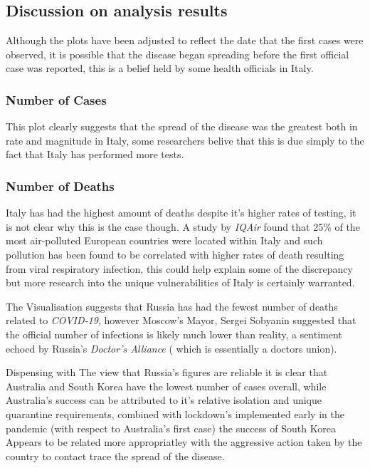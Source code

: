 \documentclass[11pt]{article}
\begin{document}
\subsection{Discussion on analysis results}
\label{sec:orgdc0628a}
Although the plots have been adjusted to reflect the date that the first cases were observed, it is possible that the disease began spreading before the first official case was reported, this is a belief held by some health officials in Italy.\cite{godin2020}

\subsubsection{Number of Cases}
\label{sec:orge8291b8}
This plot clearly suggests that the spread of the disease was the greatest both in rate and magnitude in Italy, some researchers belive that this is due simply to the fact that Italy has performed more tests. \cite{godin2020}
\subsubsection{Number of Deaths}
\label{sec:org40c1895}
Italy has had the highest amount of deaths despite it's higher rates of testing,
it is not clear why this is the case though. A study by \emph{IQAir} found that 25\% of the
most air-polluted European countries were located within Italy \cite{iqair2019}
and such pollution has been found to be correlated with higher rates of death
resulting from viral respiratory infection,
\cite{ciencewicki2007,croft2019,zhang2019} this could help explain some of the discrepancy but more research into the unique vulnerabilities of Italy is certainly warranted.

The Visualisation suggests that Russia has had the fewest number of deaths related to \emph{COVID-19}, however Moscow's Mayor, Sergei Sobyanin suggested that the official number of infections is likely much lower than reality, a sentiment echoed by Russia's \emph{Doctor's Alliance} ( which is essentially a doctors union). \cite{dole2020}

Dispensing with The view that Russia's figures are reliable it is clear that
Australia and South Korea have the lowest number of cases overall, while
Australia's success can be attributed to it's relative isolation and unique
quarantine requirements,
\cite{departmentofagrigulturewaterandtheenvironmentaustralia2019} combined with
lockdown's implemented early in the pandemic (with respect to Australia's first
case) \cite{willis2020} the success of South Korea Appears to be related more
appropriatley with the aggressive action taken by the country to contact trace the spread of the disease. \cite{thompson2020}
\end{document}
